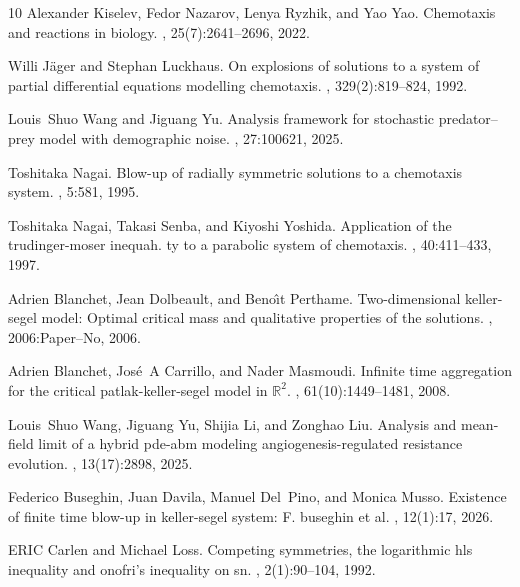 \documentclass[pdflatex,sn-mathphys-num]{sn-jnl}%
\theoremstyle{thmstyleone}
\theoremstyle{thmstyletwo}
\theoremstyle{thmstylethree}
\begin{document}
\begin{thebibliography}{10}
Alexander Kiselev, Fedor Nazarov, Lenya Ryzhik, and Yao Yao.
\newblock Chemotaxis and reactions in biology.
, 25(7):2641--2696, 2022.

Willi J{\"a}ger and Stephan Luckhaus.
\newblock On explosions of solutions to a system of partial differential equations modelling chemotaxis.
, 329(2):819--824, 1992.

Louis~Shuo Wang and Jiguang Yu.
\newblock Analysis framework for stochastic predator--prey model with demographic noise.
, 27:100621, 2025.

Toshitaka Nagai.
\newblock Blow-up of radially symmetric solutions to a chemotaxis system.
, 5:581, 1995.

Toshitaka Nagai, Takasi Senba, and Kiyoshi Yoshida.
\newblock Application of the trudinger-moser inequah. ty to a parabolic system of chemotaxis.
, 40:411--433, 1997.

Adrien Blanchet, Jean Dolbeault, and Beno{\^\i}t Perthame.
\newblock Two-dimensional keller-segel model: Optimal critical mass and qualitative properties of the solutions.
, 2006:Paper--No, 2006.

Adrien Blanchet, Jos{\'e}~A Carrillo, and Nader Masmoudi.
\newblock Infinite time aggregation for the critical patlak-keller-segel model in $\mathbb{R}^2$.
, 61(10):1449--1481, 2008.

Louis~Shuo Wang, Jiguang Yu, Shijia Li, and Zonghao Liu.
\newblock Analysis and mean-field limit of a hybrid pde-abm modeling angiogenesis-regulated resistance evolution.
, 13(17):2898, 2025.

Federico Buseghin, Juan Davila, Manuel Del~Pino, and Monica Musso.
\newblock Existence of finite time blow-up in keller-segel system: F. buseghin et al.
, 12(1):17, 2026.

ERIC Carlen and Michael Loss.
\newblock Competing symmetries, the logarithmic hls inequality and onofri's inequality on sn.
, 2(1):90--104, 1992.


\end{thebibliography}
\end{document}
